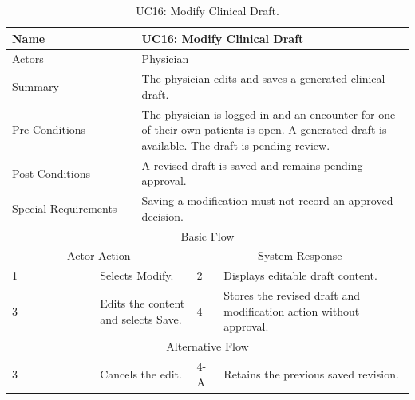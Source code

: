 \begin{table}[htbp]
\centering
\small
\caption{UC16: Modify Clinical Draft.}
\label{tab:kashaf:uc16}
\begin{tabular}{|p{}|p{}|p{}|p{}|p{}|}
\hline
\multicolumn{2}{|p{\dimexpr0.225\textwidth+2\tabcolsep+\arrayrulewidth\relax}|}{Name} & \multicolumn{3}{p{\dimexpr0.575\textwidth+4\tabcolsep+2\arrayrulewidth\relax}|}{UC16: Modify Clinical Draft} \\ \hline
\multicolumn{2}{|p{\dimexpr0.225\textwidth+2\tabcolsep+\arrayrulewidth\relax}|}{Actors} & \multicolumn{3}{p{\dimexpr0.575\textwidth+4\tabcolsep+2\arrayrulewidth\relax}|}{Physician} \\ \hline
\multicolumn{2}{|p{\dimexpr0.225\textwidth+2\tabcolsep+\arrayrulewidth\relax}|}{Summary} & \multicolumn{3}{p{\dimexpr0.575\textwidth+4\tabcolsep+2\arrayrulewidth\relax}|}{The physician edits and saves a generated clinical draft.} \\ \hline
\multicolumn{2}{|p{\dimexpr0.225\textwidth+2\tabcolsep+\arrayrulewidth\relax}|}{Pre-Conditions} & \multicolumn{3}{p{\dimexpr0.575\textwidth+4\tabcolsep+2\arrayrulewidth\relax}|}{The physician is logged in and an encounter for one of their own patients is open. A generated draft is available. The draft is pending review.} \\ \hline
\multicolumn{2}{|p{\dimexpr0.225\textwidth+2\tabcolsep+\arrayrulewidth\relax}|}{Post-Conditions} & \multicolumn{3}{p{\dimexpr0.575\textwidth+4\tabcolsep+2\arrayrulewidth\relax}|}{A revised draft is saved and remains pending approval.} \\ \hline
\multicolumn{2}{|p{\dimexpr0.225\textwidth+2\tabcolsep+\arrayrulewidth\relax}|}{Special Requirements} & \multicolumn{3}{p{\dimexpr0.575\textwidth+4\tabcolsep+2\arrayrulewidth\relax}|}{Saving a modification must not record an approved decision.} \\ \hline
\multicolumn{5}{|c|}{Basic Flow} \\ \hline
\multicolumn{3}{|c|}{Actor Action} & \multicolumn{2}{c|}{System Response} \\ \hline
1 & \multicolumn{2}{p{\dimexpr0.37\textwidth+2\tabcolsep+\arrayrulewidth\relax}|}{Selects Modify.} & 2 & Displays editable draft content. \\ \hline
3 & \multicolumn{2}{p{\dimexpr0.37\textwidth+2\tabcolsep+\arrayrulewidth\relax}|}{Edits the content and selects Save.} & 4 & Stores the revised draft and modification action without approval. \\ \hline
\multicolumn{5}{|c|}{Alternative Flow} \\ \hline
3 & \multicolumn{2}{p{\dimexpr0.37\textwidth+2\tabcolsep+\arrayrulewidth\relax}|}{Cancels the edit.} & 4-A & Retains the previous saved revision. \\ \hline
\end{tabular}
\end{table}

